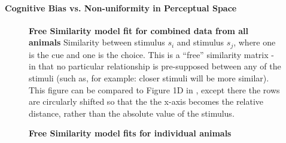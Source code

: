 \paragraph{Cognitive Bias vs. Non-uniformity in Perceptual Space}

\begin{figure}

\caption{\textbf{Free Similarity model fit for combined data from all animals}
Similarity between stimulus $s_i$ and stimulus $s_j$, where one is the cue and one is the choice. This is a ``free'' similarity matrix - in that no particular relationship is pre-supposed between any of the stimuli (such as, for example: closer stimuli will be more similar). This figure can be compared to Figure 1D in \cite{schurgin_psychophysical_2020}, except there the rows are circularly shifted so that the the x-axis becomes the relative distance, rather than the absolute value of the stimulus. %
} 
\label{fig:SimilarityMatrixCombined}
\end{figure}

\begin{figure}
    \centering
    \begin{subfigure}[b]{0.49\textwidth}
         \centering
         \caption{}
         
         \label{fig:SimilarityMatrixPollux}
    \end{subfigure}
    \hfill
    \begin{subfigure}[b]{0.49\textwidth}
         \centering
         \caption{}
             
         \label{fig:SimilarityMatrixCastor}
    \end{subfigure}
    
    \begin{subfigure}[b]{0.49\textwidth}
         \centering
         \caption{}
             
         \label{fig:SimilarityMatrixBuster}
     \end{subfigure}
     \hfill
     \begin{subfigure}[b]{0.49\textwidth}
         \centering
         \caption{}
             
         \label{fig:SimilarityMatrixMorty}
     \end{subfigure}
        \caption{\textbf{Free Similarity model fits for individual animals} }
        \label{fig:SimilarityMatrixIndividual}
\end{figure}

